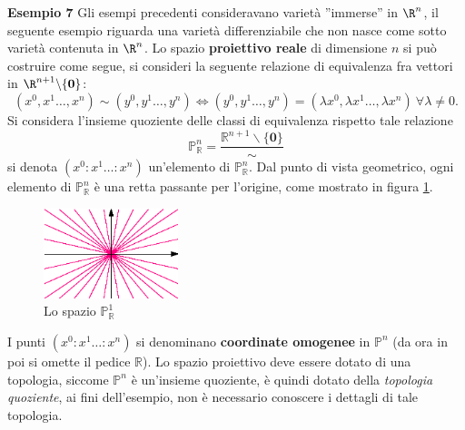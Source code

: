 \documentclass[10pt, letterpaper]{report}
\begin{document}
\noindent\textbf{Esempio 7} Gli esempi precedenti consideravano varietà ''immerse'' in $\R^n$, il seguente esempio riguarda una varietà differenziabile che non nasce come sotto varietà contenuta in $\R^n$. Lo spazio \textbf{proiettivo reale} di dimensione $n$ si può costruire come segue, si consideri la seguente relazione di equivalenza fra vettori in $\R^{n+1}\backslash\{\mathbf 0\}$:\begin{equation}
    (x^0,x^1\dots,x^n)\sim(y^0,y^1\dots,y^n)\iff (y^0,y^1\dots,y^n)=(\lambda x^0,\lambda x^1\dots,\lambda x^n) \ \forall \lambda\ne 0.
\end{equation}
Si considera l'insieme quoziente delle classi di equivalenza rispetto tale relazione\begin{equation}
    \mathbb P^n_{\mathbb R}=\frac{\mathbb R^{n+1}\backslash\{\mathbf 0\}}{\sim}
\end{equation}
si denota $(x^0:x^1\dots : x^n)$ un'elemento di $\mathbb P^n_{\mathbb R}$. Dal punto di vista geometrico, ogni elemento di $\mathbb P^n_{\mathbb R}$ è una retta passante per l'origine, come mostrato in figura \ref{img:spazio_proiettivo}.
\begin{figure}[h!]
    \center
    \includegraphics[width=0.35\textwidth ]{images/spazio_proiettivo.eps}
    \caption{Lo spazio $\mathbb P^1_{\mathbb R}$}
    \label{img:spazio_proiettivo}
\end{figure}

I punti  $(x^0:x^1\dots : x^n)$ si denominano \textbf{coordinate omogenee} in $\mathbb P^n$ (da ora in poi si omette il pedice $\mathbb R$). Lo spazio proiettivo deve essere dotato di una topologia, siccome $\mathbb P^n$ è un'insieme quoziente, è quindi dotato della \textit{topologia quoziente}, ai fini dell'esempio, non è necessario conoscere i dettagli di tale topologia.\bigskip
\end{document}

